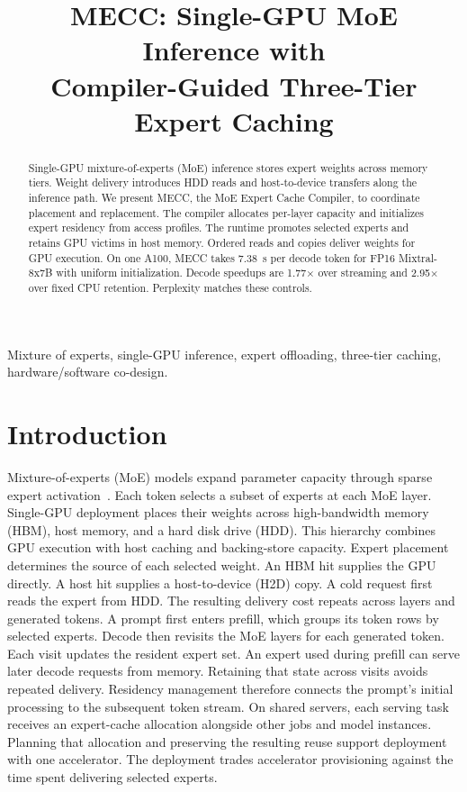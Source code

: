 \documentclass[conference,9pt,letterpaper]{IEEEtran}
\title{MECC: Single-GPU MoE Inference with\protect\\Compiler-Guided Three-Tier Expert Caching}
\author{}
\begin{document}
\maketitle\raggedbottom
\begin{abstract}
Single-GPU mixture-of-experts (MoE) inference stores expert weights across memory tiers. Weight delivery introduces HDD reads and host-to-device transfers along the inference path. We present MECC, the MoE Expert Cache Compiler, to coordinate placement and replacement. The compiler allocates per-layer capacity and initializes expert residency from access profiles. The runtime promotes selected experts and retains GPU victims in host memory. Ordered reads and copies deliver weights for GPU execution. On one A100, MECC takes 7.38~s per decode token for FP16 Mixtral-8x7B with uniform initialization. Decode speedups are 1.77$\times$ over streaming and 2.95$\times$ over fixed CPU retention. Perplexity matches these controls.
\end{abstract}

\begin{IEEEkeywords}
Mixture of experts, single-GPU inference, expert offloading, three-tier caching, hardware/software co-design.
\end{IEEEkeywords}

\section{Introduction}
Mixture-of-experts (MoE) models expand parameter capacity through sparse expert activation~\cite{shazeer,switch,mixtral,deepseekmoe}. Each token selects a subset of experts at each MoE layer. Single-GPU deployment places their weights across high-bandwidth memory (HBM), host memory, and a hard disk drive (HDD). This hierarchy combines GPU execution with host caching and backing-store capacity. Expert placement determines the source of each selected weight. An HBM hit supplies the GPU directly. A host hit supplies a host-to-device (H2D) copy. A cold request first reads the expert from HDD. The resulting delivery cost repeats across layers and generated tokens. A prompt first enters prefill, which groups its token rows by selected experts. Decode then revisits the MoE layers for each generated token. Each visit updates the resident expert set. An expert used during prefill can serve later decode requests from memory. Retaining that state across visits avoids repeated delivery. Residency management therefore connects the prompt's initial processing to the subsequent token stream. On shared servers, each serving task receives an expert-cache allocation alongside other jobs and model instances. Planning that allocation and preserving the resulting reuse support deployment with one accelerator. The deployment trades accelerator provisioning against the time spent delivering selected experts.
\end{document}
